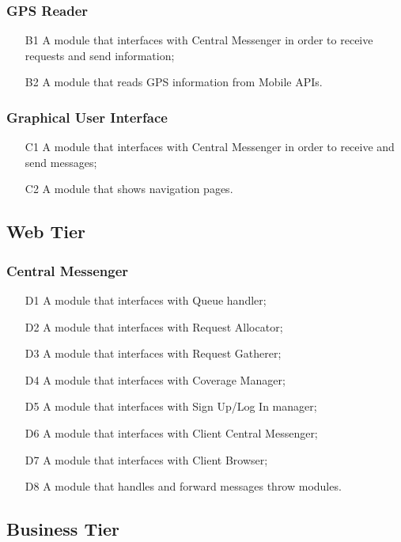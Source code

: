\subsubsection{GPS Reader}
\begin{itemize}
\item [B1] A module that interfaces with Central Messenger in order to receive requests and send information;
\item [B2] A module that reads GPS information from Mobile APIs.
\end{itemize}

\subsubsection{Graphical User Interface}
\begin{itemize}
\item [C1] A module that interfaces with Central Messenger in order to receive and send messages;
\item [C2] A module that shows navigation pages.
\end{itemize}

\subsection{Web Tier}
\subsubsection{Central Messenger}
\begin{itemize}
\item [D1] A module that interfaces with Queue handler;
\item [D2] A module that interfaces with Request Allocator;
\item [D3] A module that interfaces with Request Gatherer;
\item [D4] A module that interfaces with Coverage Manager;
\item [D5] A module that interfaces with Sign Up/Log In manager;
\item [D6] A module that interfaces with Client Central Messenger;
\item [D7] A module that interfaces with Client Browser;
\item [D8] A module that handles and forward messages throw modules.
\end{itemize}


\subsection{Business Tier}
